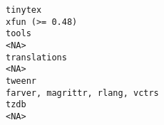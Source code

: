 \documentclass[
  letterpaper,
  DIV=11,
  numbers=noendperiod]{scrreprt}
\begin{document}
\begin{verbatim}
tinytex                                                                                                                                                                                                                                                                                                                                                                                                                                                                                                                                                                                                     xfun (>= 0.48)
tools                                                                                                                                                                                                                                                                                                                                                                                                                                                                                                                                                                                                                 <NA>
translations                                                                                                                                                                                                                                                                                                                                                                                                                                                                                                                                                                                                          <NA>
tweenr                                                                                                                                                                                                                                                                                                                                                                                                                                                                                                                                                                                      farver, magrittr, rlang, vctrs
tzdb                                                                                                                                                                                                                                                                                                                                                                                                                                                                                                                                                                                                                  <NA>

\end{verbatim}
\end{document}
